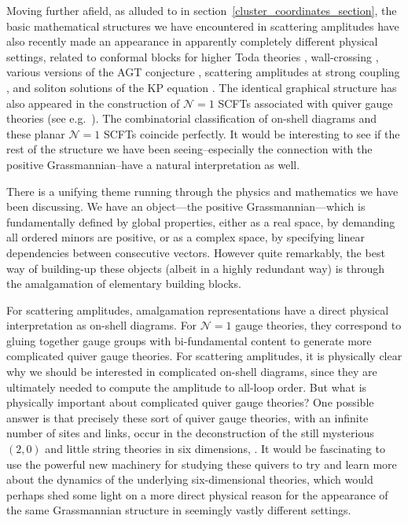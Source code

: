\documentclass[12pt,hyperref,compress]{JHEP3}
\begin{document}
Moving further afield, as alluded to in \mbox{section \ref{cluster_coordinates_section}}, the basic mathematical structures we have encountered in scattering amplitudes have also recently made an appearance in apparently completely different physical settings, related to conformal blocks for higher Toda theories \cite{FG1,FG4}, wall-crossing \cite{KS,Gaiotto:2011tf}, various versions of the AGT conjecture \cite{Alday:2009aq}, scattering amplitudes at strong coupling \cite{Alday:2010kn}, and soliton solutions of the KP equation \cite{Kodama:2011ht,Kodama:2011iq,Kodama:2012zx}. The identical graphical structure has also appeared in the construction of $\mathcal{N}\!=\!1$ SCFTs associated with quiver gauge theories (see e.g.\ \cite{Heckman:2012jh,Franco:2012wv}). The combinatorial classification of on-shell diagrams and these planar $\mathcal{N}\!=\!1$ SCFTs coincide perfectly. It would be interesting to see if the rest of the structure we have been seeing--especially the connection with the positive Grassmannian--have a natural interpretation as well.

There is a unifying theme running through the physics and mathematics we have been discussing.  We have an object---the positive Grassmannian---which is fundamentally defined by global properties, either as a real space, by demanding all ordered minors are positive, or as a complex space, by specifying linear dependencies between consecutive vectors. However quite remarkably, the best way of building-up these objects (albeit in a highly redundant way) is through the amalgamation of elementary building blocks.

For scattering amplitudes, amalgamation representations have a direct physical interpretation as on-shell diagrams. For $\mathcal{N}\!=\!1$ gauge theories, they correspond to gluing together gauge groups with bi-fundamental content to generate more complicated quiver gauge theories. For scattering amplitudes, it is physically clear why we should be interested in complicated on-shell diagrams, since they are ultimately needed to compute the amplitude to all-loop order. But what is physically important about complicated quiver gauge theories? One possible answer is that precisely these sort of quiver gauge theories, with an infinite number of sites and links, occur in the deconstruction of the still mysterious $(2,0)$ and little string theories in six dimensions,  \cite{ArkaniHamed:2001ie}. It would be fascinating to use the powerful new machinery for studying these quivers to try and learn more about the dynamics of the underlying six-dimensional theories, which would perhaps shed some light on a more direct physical reason for the appearance of the same Grassmannian structure in seemingly vastly different settings.
\end{document}
